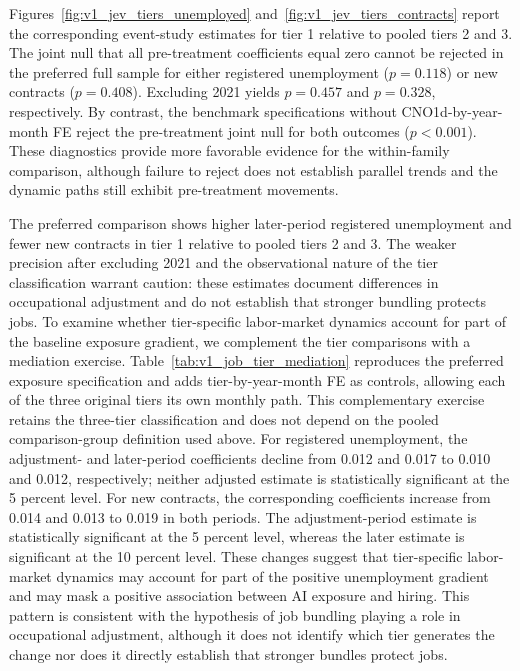Figures~\ref{fig:v1_jev_tiers_unemployed} and~\ref{fig:v1_jev_tiers_contracts} report the corresponding event-study estimates for tier 1 relative to pooled tiers 2 and 3. The joint null that all pre-treatment coefficients equal zero cannot be rejected in the preferred full sample for either registered unemployment (\(p=0.118\)) or new contracts (\(p=0.408\)). Excluding 2021 yields \(p=0.457\) and \(p=0.328\), respectively. By contrast, the benchmark specifications without CNO1d-by-year-month FE reject the pre-treatment joint null for both outcomes (\(p<0.001\)). These diagnostics provide more favorable evidence for the within-family comparison, although failure to reject does not establish parallel trends and the dynamic paths still exhibit pre-treatment movements.

The preferred comparison shows higher later-period registered unemployment and fewer new contracts in tier 1 relative to pooled tiers 2 and 3. The weaker precision after excluding 2021 and the observational nature of the tier classification warrant caution: these estimates document differences in occupational adjustment and do not establish that stronger bundling protects jobs. To examine whether tier-specific labor-market dynamics account for part of the baseline exposure gradient, we complement the tier comparisons with a mediation exercise. Table~\ref{tab:v1_job_tier_mediation} reproduces the preferred exposure specification and adds tier-by-year-month FE as controls, allowing each of the three original tiers its own monthly path. This complementary exercise retains the three-tier classification and does not depend on the pooled comparison-group definition used above. For registered unemployment, the adjustment- and later-period coefficients decline from 0.012 and 0.017 to 0.010 and 0.012, respectively; neither adjusted estimate is statistically significant at the 5 percent level. For new contracts, the corresponding coefficients increase from 0.014 and 0.013 to 0.019 in both periods. The adjustment-period estimate is statistically significant at the 5 percent level, whereas the later estimate is significant at the 10 percent level. These changes suggest that tier-specific labor-market dynamics may account for part of the positive unemployment gradient and may mask a positive association between AI exposure and hiring. This pattern is consistent with the hypothesis of job bundling playing a role in occupational adjustment, although it does not identify which tier generates the change nor does it directly establish that stronger bundles protect jobs.


